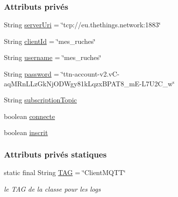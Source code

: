 \subsubsection*{Attributs privés}
\begin{DoxyCompactItemize}
\item 
String \hyperlink{classfr_1_1campus_1_1laurainc_1_1honeybee_1_1_client_m_q_t_t_acc6543bf073de1b41fae396d8c0cf83d}{server\+Uri} = \char`\"{}tcp\+://eu.\+thethings.\+network\+:1883\char`\"{}
\item 
String \hyperlink{classfr_1_1campus_1_1laurainc_1_1honeybee_1_1_client_m_q_t_t_a18f8ff3e3e2ef132a4864b77bcfc009a}{client\+Id} = \char`\"{}mes\+\_\+ruches\char`\"{}
\item 
String \hyperlink{classfr_1_1campus_1_1laurainc_1_1honeybee_1_1_client_m_q_t_t_ab0ba59ea8b9ae85d9436fbd2e96d2e8a}{username} = \char`\"{}mes\+\_\+ruches\char`\"{}
\item 
String \hyperlink{classfr_1_1campus_1_1laurainc_1_1honeybee_1_1_client_m_q_t_t_a68fea868dcd85de576fb728aadcceed7}{password} = \char`\"{}ttn-\/account-\/v2.\+vC-\/aq\+M\+Rn\+L\+Lz\+Gk\+Nj\+O\+D\+Wgy81k\+Lqzx\+B\+P\+A\+T8\+\_\+mE-\/L7\+U2\+C\+\_\+w\char`\"{}
\item 
String \hyperlink{classfr_1_1campus_1_1laurainc_1_1honeybee_1_1_client_m_q_t_t_a8771380740ea2e139b595f5b8fa7e0a5}{subscription\+Topic}
\item 
boolean \hyperlink{classfr_1_1campus_1_1laurainc_1_1honeybee_1_1_client_m_q_t_t_abf92ba9ac98a707353748665a738c1c0}{connecte}
\item 
boolean \hyperlink{classfr_1_1campus_1_1laurainc_1_1honeybee_1_1_client_m_q_t_t_a774f2fd702c2a3581bf8dbfa341274fc}{inscrit}
\end{DoxyCompactItemize}
\subsubsection*{Attributs privés statiques}
\begin{DoxyCompactItemize}
\item 
static final String \hyperlink{classfr_1_1campus_1_1laurainc_1_1honeybee_1_1_client_m_q_t_t_a378324f705f8d7870c5f7be0cea02890}{T\+AG} = \char`\"{}Client\+M\+Q\+TT\char`\"{}
\begin{DoxyCompactList}\small\item\em le T\+AG de la classe pour les logs \end{DoxyCompactList}\end{DoxyCompactItemize}


